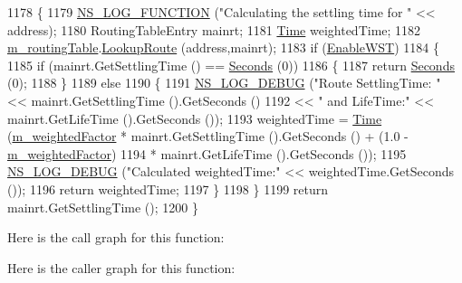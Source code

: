 \begin{DoxyCode}
1178 \{
1179   \hyperlink{log-macros-disabled_8h_a90b90d5bad1f39cb1b64923ea94c0761}{NS\_LOG\_FUNCTION} (\textcolor{stringliteral}{"Calculating the settling time for "} << address);
1180   RoutingTableEntry mainrt;
1181   \hyperlink{namespacens3_1_1TracedValueCallback_a7ffd3e7c142ffe7c8a1d2db9b8de38ec}{Time} weightedTime;
1182   \hyperlink{classns3_1_1dsdv_1_1RoutingProtocol_acc4cee466c2591e35f508ce58097a00e}{m\_routingTable}.\hyperlink{classns3_1_1dsdv_1_1RoutingTable_a0bfb9dc677f02bd740973865e38df763}{LookupRoute} (address,mainrt);
1183   \textcolor{keywordflow}{if} (\hyperlink{classns3_1_1dsdv_1_1RoutingProtocol_abf3b9f8c78278e4d2faf177146359d19}{EnableWST})
1184     \{
1185       \textcolor{keywordflow}{if} (mainrt.GetSettlingTime () == \hyperlink{group__timecivil_ga33c34b816f8ff6628e33d5c8e9713b9e}{Seconds} (0))
1186         \{
1187           \textcolor{keywordflow}{return} \hyperlink{group__timecivil_ga33c34b816f8ff6628e33d5c8e9713b9e}{Seconds} (0);
1188         \}
1189       \textcolor{keywordflow}{else}
1190         \{
1191           \hyperlink{group__logging_ga413f1886406d49f59a6a0a89b77b4d0a}{NS\_LOG\_DEBUG} (\textcolor{stringliteral}{"Route SettlingTime: "} << mainrt.GetSettlingTime ().GetSeconds ()
1192                                                << \textcolor{stringliteral}{" and LifeTime:"} << mainrt.GetLifeTime ().GetSeconds ());
1193           weightedTime = \hyperlink{namespacens3_1_1TracedValueCallback_a7ffd3e7c142ffe7c8a1d2db9b8de38ec}{Time} (\hyperlink{classns3_1_1dsdv_1_1RoutingProtocol_afd15e37062d937b28ba081fc515f3a77}{m\_weightedFactor} * mainrt.GetSettlingTime ().GetSeconds 
      () + (1.0 - \hyperlink{classns3_1_1dsdv_1_1RoutingProtocol_afd15e37062d937b28ba081fc515f3a77}{m\_weightedFactor})
1194                                * mainrt.GetLifeTime ().GetSeconds ());
1195           \hyperlink{group__logging_ga413f1886406d49f59a6a0a89b77b4d0a}{NS\_LOG\_DEBUG} (\textcolor{stringliteral}{"Calculated weightedTime:"} << weightedTime.GetSeconds ());
1196           \textcolor{keywordflow}{return} weightedTime;
1197         \}
1198     \}
1199   \textcolor{keywordflow}{return} mainrt.GetSettlingTime ();
1200 \}
\end{DoxyCode}


Here is the call graph for this function\+:




Here is the caller graph for this function\+:



